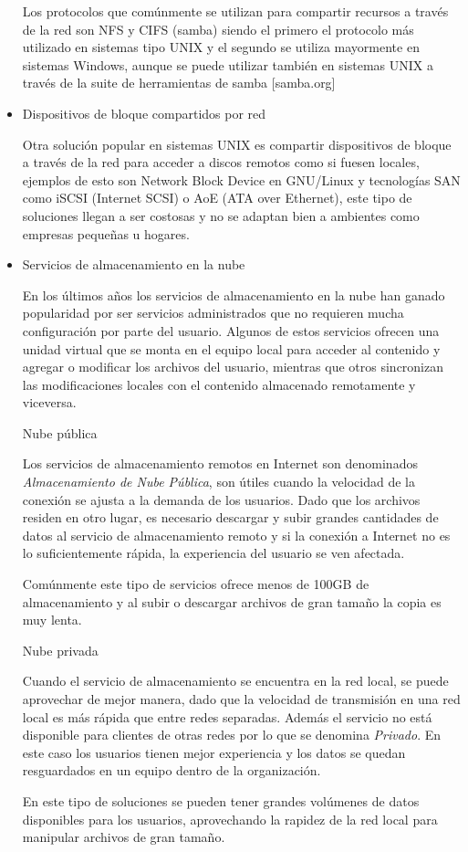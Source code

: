 \begin{itemize}
Los protocolos que com\'{u}nmente se utilizan para compartir recursos a trav\'{e}s de la red son NFS y CIFS (samba) siendo el primero el protocolo m\'{a}s utilizado en sistemas tipo UNIX y el segundo se utiliza mayormente en sistemas Windows, aunque se puede utilizar tambi\'{e}n en sistemas UNIX a trav\'{e}s de la suite de herramientas de samba [samba.org]

      \item Dispositivos de bloque compartidos por red

Otra soluci\'{o}n popular en sistemas UNIX es compartir dispositivos de bloque a trav\'{e}s de la red para acceder a discos remotos como si fuesen locales, ejemplos de esto son Network Block Device en GNU/Linux y tecnolog\'{i}as SAN como iSCSI (Internet SCSI) o AoE (ATA over Ethernet), este tipo de soluciones llegan a ser costosas y no se adaptan bien a ambientes como empresas peque\~{n}as u hogares.
    
      \item Servicios de almacenamiento en la nube

En los \'{u}ltimos a\~{n}os los servicios de almacenamiento en la nube han ganado popularidad por ser servicios administrados que no requieren mucha configuraci\'{o}n por parte del usuario. Algunos de estos servicios ofrecen una unidad virtual que se monta en el equipo local para acceder al contenido y agregar o modificar los archivos del usuario, mientras que otros sincronizan las modificaciones locales con el contenido almacenado remotamente y viceversa.

Nube p\'{u}blica

Los servicios de almacenamiento remotos en Internet son denominados \emph{Almacenamiento de Nube P\'{u}blica}, son \'{u}tiles cuando la velocidad de la conexi\'{o}n se ajusta a la demanda de los usuarios. Dado que los archivos residen en otro lugar, es necesario descargar y subir grandes cantidades de datos al servicio de almacenamiento remoto y si la conexi\'{o}n a Internet no es lo suficientemente r\'{a}pida, la experiencia del usuario se ven afectada.

Com\'{u}nmente este tipo de servicios ofrece menos de 100GB de almacenamiento y al subir o descargar archivos de gran tama\~{n}o la copia es muy lenta.

Nube privada

Cuando el servicio de almacenamiento se encuentra en la red local, se puede aprovechar de mejor manera, dado que la velocidad de transmisi\'{o}n en una red local es m\'{a}s r\'{a}pida que entre redes separadas. Adem\'{a}s el servicio no est\'{a} disponible para clientes de otras redes por lo que se denomina \emph{Privado}. En este caso los usuarios tienen mejor experiencia y los datos se quedan resguardados en un equipo dentro de la organizaci\'{o}n.

En este tipo de soluciones se pueden tener grandes vol\'{u}menes de datos disponibles para los usuarios, aprovechando la rapidez de la red local para manipular archivos de gran tama\~{n}o.

    \end{itemize}

